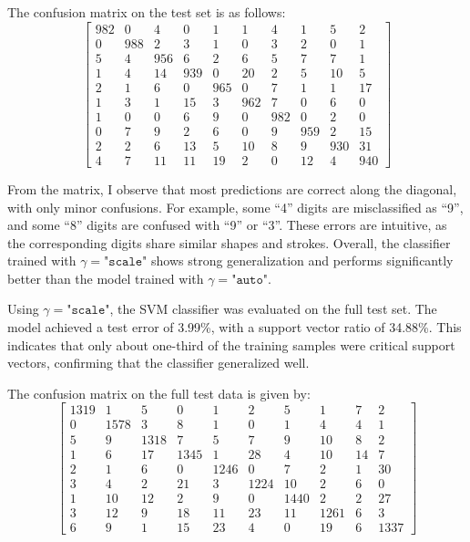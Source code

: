 \documentclass[11pt, reqno, letterpaper, twoside]{amsart}
\theoremstyle{plain}
\theoremstyle{definition}
\begin{document}
The confusion matrix on the test set is as follows:
\[
\begin{bmatrix}
982 & 0 & 4 & 0 & 1 & 1 & 4 & 1 & 5 & 2 \\
0 & 988 & 2 & 3 & 1 & 0 & 3 & 2 & 0 & 1 \\
5 & 4 & 956 & 6 & 2 & 6 & 5 & 7 & 7 & 1 \\
1 & 4 & 14 & 939 & 0 & 20 & 2 & 5 & 10 & 5 \\
2 & 1 & 6 & 0 & 965 & 0 & 7 & 1 & 1 & 17 \\
1 & 3 & 1 & 15 & 3 & 962 & 7 & 0 & 6 & 0 \\
1 & 0 & 0 & 6 & 9 & 0 & 982 & 0 & 2 & 0 \\
0 & 7 & 9 & 2 & 6 & 0 & 9 & 959 & 2 & 15 \\
2 & 2 & 6 & 13 & 5 & 10 & 8 & 9 & 930 & 31 \\
4 & 7 & 11 & 11 & 19 & 2 & 0 & 12 & 4 & 940
\end{bmatrix}
\]

From the matrix, I observe that most predictions are correct along the diagonal, 
with only minor confusions. For example, some ``4'' digits are misclassified as ``9'', 
and some ``8'' digits are confused with ``9'' or ``3''. These errors are intuitive, 
as the corresponding digits share similar shapes and strokes. 
Overall, the classifier trained with $\gamma=\texttt{"scale"}$ shows strong generalization 
and performs significantly better than the model trained with $\gamma=\texttt{"auto"}$.

Using $\gamma=\texttt{"scale"}$, the SVM classifier was evaluated on the full test set. 
The model achieved a test error of 3.99\%, 
with a support vector ratio of 34.88\%. 
This indicates that only about one-third of the training samples were critical support vectors, 
confirming that the classifier generalized well.

The confusion matrix on the full test data is given by:
\[
\begin{bmatrix}
1319 & 1 & 5 & 0 & 1 & 2 & 5 & 1 & 7 & 2 \\
0 & 1578 & 3 & 8 & 1 & 0 & 1 & 4 & 4 & 1 \\
5 & 9 & 1318 & 7 & 5 & 7 & 9 & 10 & 8 & 2 \\
1 & 6 & 17 & 1345 & 1 & 28 & 4 & 10 & 14 & 7 \\
2 & 1 & 6 & 0 & 1246 & 0 & 7 & 2 & 1 & 30 \\
3 & 4 & 2 & 21 & 3 & 1224 & 10 & 2 & 6 & 0 \\
1 & 10 & 12 & 2 & 9 & 0 & 1440 & 2 & 2 & 27 \\
3 & 12 & 9 & 18 & 11 & 23 & 11 & 1261 & 6 & 3 \\
6 & 9 & 1 & 15 & 23 & 4 & 0 & 19 & 6 & 1337
\end{bmatrix}
\]
\end{document}
